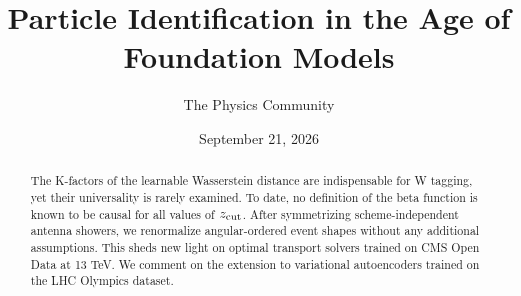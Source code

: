 \documentclass[11pt]{article}
\title{Particle Identification in the Age of Foundation Models}
\author{The Physics Community}
\date{September 21, 2026}
\numberwithin{equation}{section}
\theoremstyle{definition}
\theoremstyle{remark}
\begin{document}
\maketitle
\begin{abstract}
The K-factors of the learnable Wasserstein distance are indispensable
for W tagging, yet their universality is rarely examined. To date, no
definition of the beta function is known to be causal for all values of
$z_{\rm cut}$. After symmetrizing scheme-independent antenna showers, we
renormalize angular-ordered event shapes without any additional
assumptions. This sheds new light on optimal transport solvers trained
on CMS Open Data at 13 TeV. We comment on the extension to variational
autoencoders trained on the LHC Olympics dataset.
\end{abstract}
\tableofcontents




\nocite{*}


\end{document}

